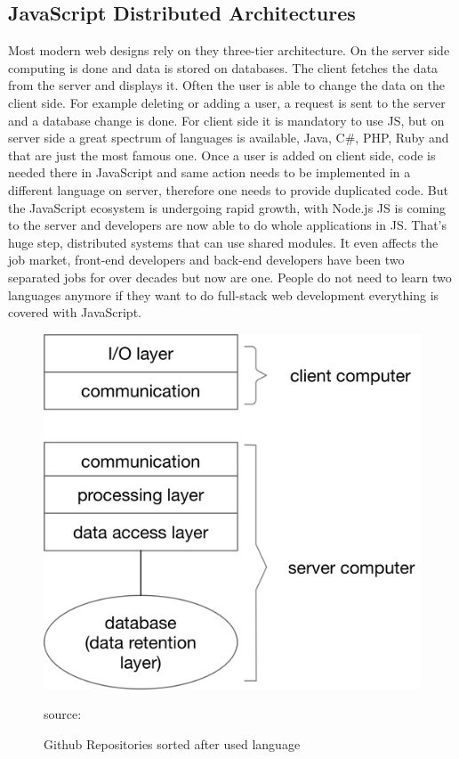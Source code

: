 \newpage

\subsection{JavaScript Distributed Architectures}
Most modern web designs rely on they three-tier architecture. On the server side computing is done and data is stored on databases. The client fetches the data from the server and displays it. Often the user is able to change the data on the client side. For example deleting or adding a user, a request is sent to the server and a database change is done. For client side it is mandatory to use \gls{JS}, but on server side  a great spectrum of languages is available, Java, C#, PHP, Ruby and that are just the most famous one. Once a user is added on client side, code is needed there in JavaScript and same action needs to be implemented in a different language on server, therefore one needs to provide duplicated code. But the JavaScript ecosystem is undergoing rapid growth, with Node.js \gls{JS} is coming to the server and developers are now able to do whole applications in \gls{JS}. That's huge step, distributed systems that can use shared modules. It even affects the job market, front-end developers and back-end developers have been two separated jobs for over decades but now are one. People do not need to learn two languages anymore if they want to do full-stack web development everything is covered with JavaScript.




\begin{figure}[hb]
	\centering
	\includegraphics[scale=0.5]{bilder/grundlagen/Three-Tier.png}
	\caption{Github Repositories sorted after used language} source:\cite{JS}
	\label{fig:JS}
\end{figure}




